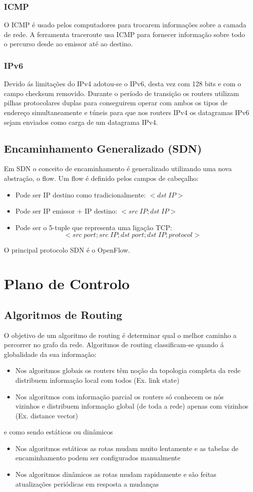 \documentclass[10pt,a4paper]{report}
\begin{document}
\subsubsection{ICMP}
O ICMP é usado pelos computadores para trocarem informações sobre a camada de rede. A ferramenta traceroute usa ICMP para fornecer informação sobre todo o percurso desde ao emissor até ao destino.
\subsubsection{IPv6}
Devido ás limitações do IPv4 adotou-se o IPv6, desta vez com 128 bits e com o campo checksum removido. Durante o período de transição os routers utilizam pilhas protocolares duplas para conseguirem operar com ambos os tipos de endereço simultaneamente e túneis para que nos routers IPv4 os datagramas IPv6 sejam enviados como carga de um datagrama IPv4.
\subsection{Encaminhamento Generalizado (SDN)}
Em SDN o conceito de encaminhamento é generalizado utilizando uma nova abstração, o flow. Um flow é definido pelos campos de cabeçalho:
\begin{itemize}
\item Pode ser IP destino como tradicionalmente: $<dst\;IP>$
\item Pode ser IP emissor + IP destino: $<src\;IP; dst\;IP>$
\item Pode ser o 5-tuple que representa uma ligação TCP: $$<src\;port; src\;IP; dst\;port; dst\;IP; protocol>$$
\end{itemize}
O principal protocolo SDN é o OpenFlow.
\section{Plano de Controlo}
\subsection{Algoritmos de Routing}
O objetivo de um algoritmo de routing é determinar qual o melhor caminho a percorrer no grafo da rede.
Algoritmos de routing classificam-se quando á globalidade da sua informação:
\begin{itemize}
\item Nos algoritmos globais os routers têm noção da topologia completa da rede distribuem informação local com todos (Ex. link state)
\item Nos algoritmos com informação parcial os routers só conhecem os nós vizinhos e distribuem informação global (de toda a rede) apenas
com vizinhos (Ex. distance vector)
\end{itemize}
e como sendo estáticos ou dinâmicos
\begin{itemize}
\item Nos algoritmos estáticos as rotas mudam muito lentamente e as tabelas de encaminhamento podem ser configurados manualmente
\item Nos algoritmos dinâmicos as rotas mudam rapidamente e são feitas atualizações periódicas em resposta a mudanças
\end{itemize}
\end{document}
